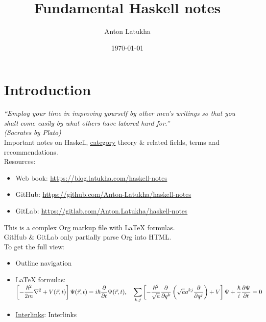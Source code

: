 \documentclass[a4paper,14pt,oneside]{book}
\author{Anton Latukha}
\date{\today}
\title{Fundamental Haskell notes}
\begin{document}
\maketitle
\setcounter{tocdepth}{10}
\tableofcontents

\setcounter{tocdepth}{10}
\tableofcontents

\part{Introduction}
\label{sec:org1de5659}

\emph{“Employ your time in improving yourself by other men's writings so that you shall come easily by what others have labored hard for.”\\
(Socrates by Plato)}\\

Important notes on Haskell, \hyperref[org841d8bc]{category} theory \& related fields, terms and recommendations.\\

Resources:\\
\begin{itemize}
\item Web book: \url{https://blog.latukha.com/haskell-notes}\\
\item GitHub: \url{https://github.com/Anton-Latukha/haskell-notes}\\
\item GitLab: \url{https://gitlab.com/Anton.Latukha/haskell-notes}\\
\end{itemize}

This is a complex Org markup file with \LaTeX{} formulas.\\
GitHub \& GitLab only partially parse Org into HTML.\\

To get the full view:\\
\begin{itemize}
\item Outline navigation\\
\item \LaTeX{} formulas: \({\displaystyle\left[{-\frac{\hbar^{2}}{2m}}\nabla^{2}+V(\vec{r},t)\right]\Psi({\vec{r}},t)=i\hbar{\partial\over\partial{t}}\Psi({\vec{r}},t),\quad\sum_{k,j}\left[-{\frac{\hbar^{2}}{\sqrt{a}}}{\frac{\partial}{\partial{q^{k}}}}\left({\sqrt{a}}a^{kj}{\frac{\partial}{\partial{q^{j}}}}\right)+V\right]\Psi+{\frac{\hbar}{i}}{\frac{\partial{\Psi}}{\partial{t}}}=0}\)\\
\item \hyperref[orga9182b4]{Interlinks}: \label{orga9182b4}Interlinks\\
\end{itemize}
\end{document}
